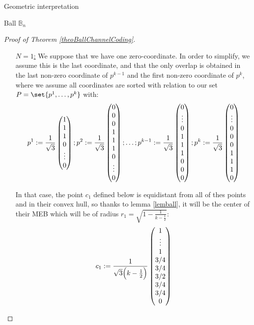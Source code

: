 \documentclass{article}
\theoremstyle{definition}
\theoremstyle{remark}
\begin{document}
\begin{subsection}{Geometric interpretation}
\begin{subsubsection}{Ball $\mathbb{B}_n$}
\begin{proof}[Proof of Theorem \ref{theoBallChannelCoding}]
\begin{itemize}
    \item[\underline{$N = 1$:}] We suppose that we have one zero-coordinate. In order to simplify, we assume this is the last coordinate, and that the only overlap is obtained in the last non-zero coordinate of $p^{k-1}$ and the first non-zero coordinate of $p^k$, where we assume all coordinates are sorted with relation to our set $P = \set{p^1, \ldots, p^k}$ with:
      \[ p^1 := \frac{1}{\sqrt{3}}\pmqty{1\\1\\1\\0\\\vdots\\0} ; p^2 := \frac{1}{\sqrt{3}}\pmqty{0\\0\\0\\1\\1\\1\\0\\\vdots\\0} ; \ldots ; p^{k-1} := \frac{1}{\sqrt{3}}\pmqty{0\\\vdots\\0\\1\\1\\1\\0\\0\\0} ; p^k := \frac{1}{\sqrt{3}}\pmqty{0\\\vdots\\0\\0\\0\\1\\1\\1\\0} \]

      In that case, the point $c_1$ defined below is equidistant from all of thes points and in their convex hull, so thanks to lemma \ref{lemball}, it will be the center of their MEB which will be of radius $r_1 = \sqrt{1-\frac{1}{k-\frac{1}{2}}}$:
      \[ c_1 := \frac{1}{\sqrt{3}\Big(k-\frac{1}{2}\Big)}\pmqty{1\\\vdots\\1\\3/4\\3/4\\3/2\\3/4\\3/4\\0}\]


\end{itemize}
\end{proof}
\end{subsubsection}
\end{subsection}
\end{document}
